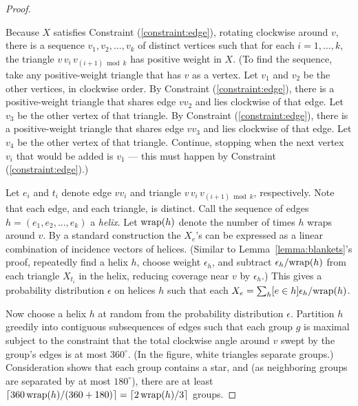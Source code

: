 \documentclass[final]{siamltex}
\newcommand{\edge}{e}
\newcommand{\tri}{t}  \newcommand{\vertex}{v}
\newcommand{\fracTriang}{X}
\begin{document}
\begin{proof}
\begin{window}
    Because $\fracTriang$ satisfies Constraint (\ref{constraint:edge}),
    rotating clockwise around $\vertex$, 
    there is a sequence $\vertex_1,\vertex_2,\ldots,\vertex_k$
    of distinct vertices
    such that for each $i=1,\ldots,k$,
    the triangle $\vertex\, \vertex_i\, \vertex_{(i+1)\bmod k}$
    has positive weight in $\fracTriang$.
    (To find the sequence, take any positive-weight triangle that has $v$ as a vertex.
    Let $\vertex_1$ and $\vertex_2$ be the other vertices, in clockwise order.
    By Constraint (\ref{constraint:edge}), there is a positive-weight triangle 
    that shares edge $\vertex \vertex_2$ and lies clockwise of that edge.
    Let $\vertex_3$ be the other vertex of that triangle.
    By Constraint (\ref{constraint:edge}), there is a positive-weight triangle 
    that shares edge $\vertex \vertex_3$ and lies clockwise of that edge.
    Let  $\vertex_4$ be the other vertex of that triangle.
    Continue, stopping when the next vertex $\vertex_i$
    that would be added is $\vertex_1$ ---
    this must happen by Constraint (\ref{constraint:edge}).)
  \end{window}
  
  Let $\edge_i$ and $\tri_i$ denote edge $\vertex \vertex_i$ 
  and triangle $\vertex\, \vertex_i\, \vertex_{(i+1)\bmod k}$, respectively.
  Note that each edge, and each triangle, is distinct.
  Call the sequence of edges $h = (\edge_1,\edge_2,\ldots,\edge_k)$ a {\em helix}.
  Let $\text{wrap}(h)$ denote the number of times $h$ wraps around $\vertex$.
  By a standard construction
the $\fracTriang_\edge$'s 
  can be expressed as a linear combination of incidence vectors of helices.
  (Similar to Lemma~\ref{lemma:blankets}'s proof,
  repeatedly find a helix $h$, choose weight $\epsilon_h$,
  and subtract $\epsilon_h/\text{wrap}(h)$ from each triangle $\fracTriang_{\tri_i}$ in the helix,
  reducing coverage near $\vertex$ by $\epsilon_h$.)
  This gives a probability distribution $\epsilon$ on helices $h$
  such that each $\fracTriang_\edge = \sum_{h} [\edge\in h] \epsilon_h/ \wrap(h)$.

Now choose a helix $h$ at random from the probability distribution $\epsilon$.
  Partition $h$ greedily into contiguous subsequences of edges such that each
  group $g$ is maximal subject to the constraint that the total clockwise angle around $v$
  swept by the group's edges is at most $360^\circ$.
  (In the figure, white triangles separate groups.)
  Consideration shows that each group contains a star,
  and (as neighboring groups are separated by at most $180^\circ$),
  there are at least $\lceil 360\, \text{wrap}(h) /(360+180)\rceil  
  = \lceil 2\, \text{wrap}(h)/3\rceil$ groups.


\end{proof}
\end{document}
